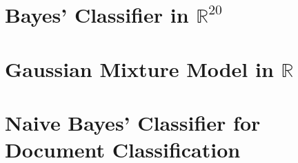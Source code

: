 \documentclass[11pt, a4 paper]{article}
\newcommand{\rr}{\mathbb{R}}
\begin{document}
\section{Bayes' Classifier in $\rr^{20}$}
\label{sec:bayes20D}

\label{prob:2}



\section{Gaussian Mixture Model in $\rr$}
\label{sec:gmm}

\label{prob:3}



\section{Naive Bayes' Classifier for Document Classification}
\label{sec:docClassification}


\end{document}

